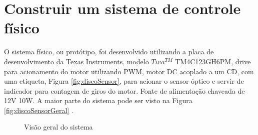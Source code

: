 


\section{ Construir um sistema de controle físico }

 O sistema físico, ou protótipo, foi desenvolvido utilizando a placa de desenvolvimento da Texas Instruments, modelo $Tiva^{TM}$ TM4C123GH6PM, drive para acionamento do motor utilizando PWM, motor DC acoplado a um CD, com uma etiqueta, Figura \ref{fig:discoSensor}, para acionar o sensor óptico e servir de indicador para contagem de giros do motor. Fonte de alimentação chaveada de 12V 10W. A maior parte do sistema pode ser visto na Figura \ref{fig:discoSensorGeral} .



\begin{figure}[!htb]
\center
{}

\caption{Visão geral do sistema }
\end{figure}


